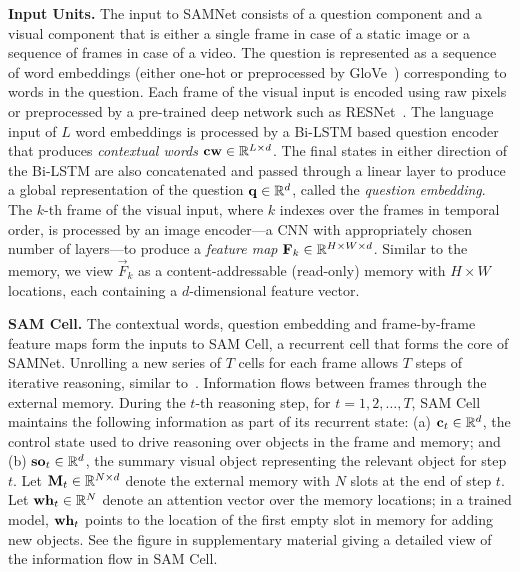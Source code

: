\noindent\textbf{Input Units.}
The input to SAMNet consists of a question component and a visual component that is either a single frame in case of a static image or a sequence of frames in case of a video.
The question is represented as a sequence of word embeddings (either one-hot or preprocessed by GloVe~\cite{pennington2014glove}) corresponding to words in the question.
Each frame of the visual input is encoded using raw pixels or preprocessed by a pre-trained deep network such as RESNet~\cite{he2016deep}.
The language input of $L$ word embeddings is processed by a Bi-LSTM based question encoder that produces \emph{contextual words} $\mathbf{cw} \in \mathbb{R}^{L \times d}$.
The final states in either direction of the Bi-LSTM are also concatenated and passed through a linear layer to produce a global representation of the question
$\mathbf{q} \in \mathbb{R}^d$, called the \emph{question embedding}.
The $k$-th frame of the visual input, where $k$ indexes over the frames in temporal order, is processed by an image encoder---a CNN with appropriately chosen number of layers---to produce a \emph{feature map}
$\mathbf{F}_k \in \mathbb{R}^{H \times W \times d}$.
Similar to the memory, we view $\vec{F}_k$ as a content-addressable (read-only) memory with 
$H \times W$ locations, each containing a $d$-dimensional feature vector.

\smallskip

\noindent\textbf{SAM Cell.}
The contextual words, question embedding and frame-by-frame feature maps form the inputs to SAM Cell, a recurrent cell that forms the core of SAMNet. Unrolling a new series of $T$ cells for each frame allows $T$ steps of iterative reasoning, similar to~\cite{hudson2018compositional}. Information flows between frames through the external memory.
During the $t$-th reasoning step, for $t=1,2, \dots, T$, SAM Cell maintains the following information as part of its recurrent state:
(a) $\mathbf{c}_t \in \mathbb{R}^d$, the control state used to drive reasoning over objects in the frame and memory; and
(b) $\mathbf{so}_t  \in \mathbb{R}^d$, the summary visual object representing the relevant object for step $t$.
Let $\mathbf{M}_t \in  \mathbb{R}^{N \times d}$ denote the external memory with $N$ slots at the end of step $t$.
Let $\mathbf{wh}_t \in  \mathbb{R}^N$ denote an attention vector over the memory locations;
in a trained model, $\mathbf{wh}_t$ points to the location of the first empty slot in memory for adding new objects.
See the figure in supplementary material giving a detailed view of the information flow in SAM Cell.

\smallskip

